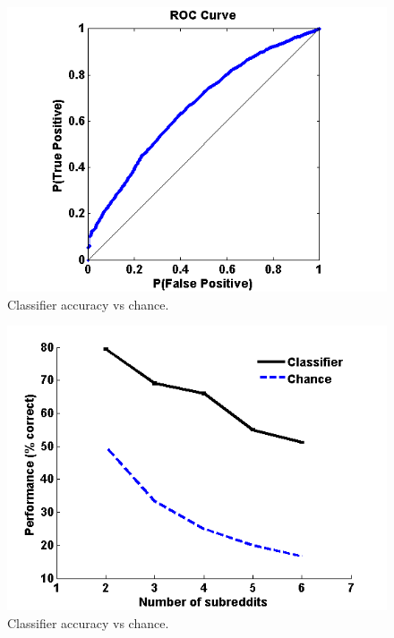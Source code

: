 \documentclass[10pt,twocolumn]{article}
\begin{document}
\begin{figure}
    \centering
  	\includegraphics[scale=0.5]{./roc.png}
  	\caption{Classifier accuracy vs chance.}
  	\label{fig:RSUencountered}
\end{figure}		
	
		
\begin{figure}
    \centering
  	\includegraphics[scale=0.4]{./varyWBaseline.png}
  	\caption{Classifier accuracy vs chance.}
  	\label{fig:RSUencountered}
\end{figure}	
	
\end{document}
